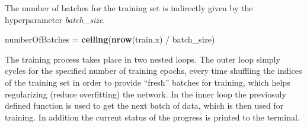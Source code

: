 \documentclass[]{article}
\newenvironment{Shaded}{\begin{snugshade}}{\end{snugshade}}
\newcommand{\KeywordTok}[1]{\textcolor[rgb]{0.13,0.29,0.53}{\textbf{{#1}}}}
\newcommand{\DataTypeTok}[1]{\textcolor[rgb]{0.13,0.29,0.53}{{#1}}}
\newcommand{\CharTok}[1]{\textcolor[rgb]{0.31,0.60,0.02}{{#1}}}
\newcommand{\StringTok}[1]{\textcolor[rgb]{0.31,0.60,0.02}{{#1}}}
\newcommand{\NormalTok}[1]{{#1}}
\begin{document}
The number of batches for the training set is indirectly given by the
hyperparameter \emph{batch\_size}.

\begin{Shaded}
\begin{Highlighting}[]
\NormalTok{numberOfBatches =}\StringTok{ }\KeywordTok{ceiling}\NormalTok{(}\KeywordTok{nrow}\NormalTok{(train.x) /}\StringTok{ }\NormalTok{batch_size)}
\end{Highlighting}
\end{Shaded}

The training process takes place in two nested loops. The outer loop
simply cycles for the specified number of training epochs, every time
shuffling the indices of the training set in order to provide ``fresh''
batches for training, which helps regularizing (reduce overfitting) the
network. In the inner loop the previosuly defined function is used to
get the next batch of data, which is then used for training. In addition
the current status of the progress is printed to the terminal.

\begin{Shaded}
\end{Shaded}
\end{document}
